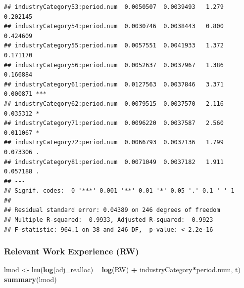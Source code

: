 \documentclass[
]{article}
\newenvironment{Shaded}{\begin{snugshade}}{\end{snugshade}}
\newcommand{\KeywordTok}[1]{\textcolor[rgb]{0.13,0.29,0.53}{\textbf{#1}}}
\newcommand{\NormalTok}[1]{#1}
\newcommand{\OperatorTok}[1]{\textcolor[rgb]{0.81,0.36,0.00}{\textbf{#1}}}
\newcommand{\StringTok}[1]{\textcolor[rgb]{0.31,0.60,0.02}{#1}}
\begin{document}
\begin{verbatim}
## industryCategory53:period.num  0.0050507  0.0039493   1.279 0.202145    
## industryCategory54:period.num  0.0030746  0.0038443   0.800 0.424609    
## industryCategory55:period.num  0.0057551  0.0041933   1.372 0.171170    
## industryCategory56:period.num  0.0052637  0.0037967   1.386 0.166884    
## industryCategory61:period.num  0.0127563  0.0037846   3.371 0.000871 ***
## industryCategory62:period.num  0.0079515  0.0037570   2.116 0.035312 *  
## industryCategory71:period.num  0.0096220  0.0037587   2.560 0.011067 *  
## industryCategory72:period.num  0.0066793  0.0037136   1.799 0.073306 .  
## industryCategory81:period.num  0.0071049  0.0037182   1.911 0.057188 .  
## ---
## Signif. codes:  0 '***' 0.001 '**' 0.01 '*' 0.05 '.' 0.1 ' ' 1
## 
## Residual standard error: 0.04389 on 246 degrees of freedom
## Multiple R-squared:  0.9933, Adjusted R-squared:  0.9923 
## F-statistic: 964.1 on 38 and 246 DF,  p-value: < 2.2e-16
\end{verbatim}

\hypertarget{relevant-work-experience-rw}{%
\subsubsection{Relevant Work Experience
(RW)}\label{relevant-work-experience-rw}}

\begin{Shaded}
\begin{Highlighting}[]
\NormalTok{lmod <-}\StringTok{ }\KeywordTok{lm}\NormalTok{(}\KeywordTok{log}\NormalTok{(adj_realloc) }\OperatorTok{~}\StringTok{  }\KeywordTok{log}\NormalTok{(RW) }\OperatorTok{+}\StringTok{ }\NormalTok{industryCategory}\OperatorTok{*}\NormalTok{period.num, t)}
\KeywordTok{summary}\NormalTok{(lmod)}
\end{Highlighting}
\end{Shaded}
\end{document}
